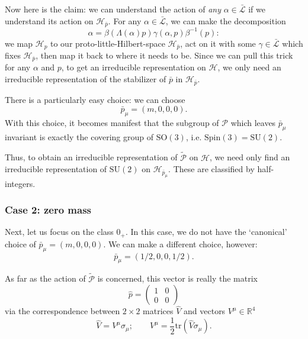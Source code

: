 \documentclass[a4paper]{report}
\newcommand{\R}{\mathbb{R}}
\newcommand{\SO}{\mathrm{SO}}
\newcommand{\SU}{\mathrm{SU}}
\theoremstyle{definition}
\theoremstyle{plain}
\theoremstyle{remark}
\begin{document}
Now here is the claim: we can understand the action of \emph{any} $\alpha \in \bar{\mathcal{L}}$ if we understand its action on $\mathscr{H}_{\bar{p}}$. For any $\alpha \in \bar{\mathcal{L}}$, we can make the decomposition 
\begin{equation*}
  \alpha = \beta(\Lambda(\alpha)p) \gamma(\alpha, p) \beta^{-1}(p):
\end{equation*}
we map $\mathscr{H}_{p}$ to our proto-little-Hilbert-space $\mathscr{H}_{\bar{p}}$, act on it with some $\gamma \in \bar{\mathcal{L}}$ which fixes $\mathscr{H}_{\bar{p}}$, then map it back to where it needs to be. Since we can pull this trick for any $\alpha$ and $p$, to get an irreducible representation on $\mathscr{H}$, we only need an irreducible representation of the stabilizer of $\bar{p}$ in $\mathscr{H}_{\bar{p}}$. 

There is a particularly easy choice: we can choose 
\begin{equation*}
  \bar{p}_{\mu} = (m,0,0,0).
\end{equation*}
With this choice, it becomes manifest that the subgroup of $\mathcal{P}$ which leaves $\bar{p}_{\mu}$ invariant is exactly the covering group of $\SO(3)$, i.e. $\mathrm{Spin}(3) = \SU(2)$.

Thus, to obtain an irreducible representation of $\widetilde{\mathcal{P}}$ on $\mathscr{H}$, we need only find an irreducible representation of $\SU(2)$ on $\mathscr{H}_{\bar{p}_{\mu}}$. These are classified by half-integers.

\subsubsection{Case 2: zero mass}
Next, let us focus on the class $0_{+}$. In this case, we do not have the `canonical' choice of $\bar{p}_{\mu} = (m,0,0,0)$. We can make a different choice, however:
\begin{equation*}
  \bar{p}_{\mu} = (1/2,0,0,1/2).
\end{equation*}

As far as the action of $\widetilde{\mathcal{P}}$ is concerned, this vector is really the matrix
\begin{equation*}
  \hat{p} = 
  \begin{pmatrix}
    1 & 0 \\
    0 & 0
  \end{pmatrix}
\end{equation*}
via the correspondence between $2 \times 2$ matrices $\hat{V}$ and vectors $V^{\mu} \in \R^{4}$
\begin{equation*}
  \hat{V} = V^{\mu}\sigma_{\mu};\qquad V^{\mu} = \frac{1}{2} \mathrm{tr}(\hat{V} \sigma_{\mu}).
\end{equation*}
\end{document}
